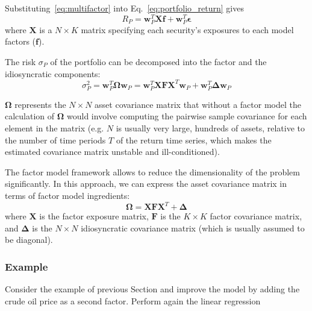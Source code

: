 Substituting~\ref{eq:multifactor} into Eq.~\ref{eq:portfolio_return} gives
\begin{equation}
R_P = \mathbf{w}^T_P \mathbf{Xf} + \mathbf{w}^T_P\boldsymbol{\epsilon}
\end{equation}
where $\mathbf{X}$ is a $N\times K$ matrix specifying each security’s exposures to each model factors ($\mathbf{f}$). 

The risk $\sigma_P$ of the portfolio can be decomposed into the factor and the idiosyncratic components: 
\begin{equation}
\sigma^2_P = \mathbf{w}_P^T\mathbf{\Omega}\mathbf{w}_P = \mathbf{w}_P^T \mathbf{XFX}^T \mathbf{w}_P + \mathbf{w}_P^T \mathbf{\Delta} \mathbf{w}_P
\end{equation}

$\mathbf{\Omega}$ represents the $N \times N$ asset covariance matrix that without a factor model the calculation of $\mathbf{\Omega}$ would involve computing the pairwise sample covariance for each element in the matrix (e.g. $N$ is usually very large, hundreds of assets, relative to the number of time periods $T$ of the return time series, which makes the estimated covariance matrix unstable and ill-conditioned).

The factor model framework allows to reduce the dimensionality of the problem significantly. In this approach, we can express the asset covariance matrix in terms of factor model ingredients:
\begin{equation}
\mathbf{\Omega} = \mathbf{XFX}^T + \mathbf{\Delta}
\end{equation}
where $\mathbf{X}$ is the factor exposure matrix, $\mathbf{F}$ is the $K\times K$ factor covariance matrix, and $\mathbf{\Delta}$ is the $N\times N$ idiosyncratic covariance matrix (which is usually assumed to be diagonal). 

\subsubsection{Example}

Consider the example of previous Section and improve the model by adding the crude oil price as a second factor. Perform again the linear regression


